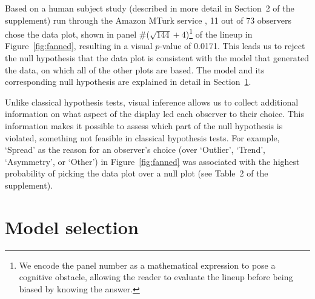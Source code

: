 \documentclass[12pt]{article}
\newcommand{\alnote}[1]{\todo[inline,color=green!40]{#1}} %
\newcommand{\hhnote}[1]{\todo[inline,color=orange!40]{#1}}
\begin{document}
Based on a human subject study (described in more detail in Section~2 of the supplement) run through the Amazon MTurk service \citep{amazon}, 11 out of 73 observers  chose the  data plot, shown in panel  \#($\sqrt{144} + 4$)\footnote{We encode the panel number as a mathematical expression to pose a cognitive obstacle, allowing the reader to evaluate the lineup before being biased by knowing the answer.}
 of the lineup in Figure~\ref{fig:fanned}, resulting in a visual $p$-value of 0.0171. This leads us to reject the null hypothesis that the data plot %
is consistent with the model that generated the data, on which all of the other plots are based. The  model and its corresponding null hypothesis  are explained in detail in Section~\ref{sec:select}.  


Unlike classical hypothesis tests, visual inference  allows us to collect additional information on what aspect of the display led each observer to their choice. 
This  information makes it possible to assess which part of the null hypothesis is violated, something not feasible in classical hypothesis tests. For example,  `Spread' as the reason for an observer's choice (over `Outlier', `Trend',  `Asymmetry', or `Other') in Figure~\ref{fig:fanned} was associated with the highest probability of picking the data plot over a null plot (see Table~2 of the supplement).




\section{Model selection}\label{sec:select}
\end{document}
